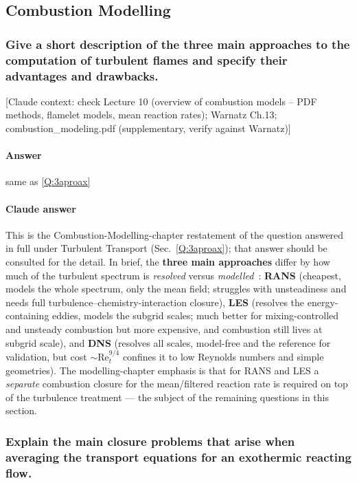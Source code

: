 \subsection{Combustion Modelling}

\subsubsection{Give a short description of the three main approaches to the computation of turbulent flames and specify their advantages and drawbacks.}

{\color{gray}\footnotesize [Claude context: check Lecture 10 (overview of combustion models -- PDF methods, flamelet models, mean reaction rates); Warnatz Ch.13; combustion\_modeling.pdf (supplementary, verify against Warnatz)]}

\paragraph{Answer}  same as \ref{Q:3aproax}

{\color{istblue}
\paragraph{Claude answer}
This is the Combustion-Modelling-chapter restatement of the question answered in full under Turbulent Transport (Sec.~\ref{Q:3aproax}); that answer should be consulted for the detail. In brief, the \textbf{three main approaches} differ by how much of the turbulent spectrum is \emph{resolved} versus \emph{modelled}~\cite{lecture10,veynante2002turbulent,pope2000turbulent}: \textbf{RANS} (cheapest, models the whole spectrum, only the mean field; struggles with unsteadiness and needs full turbulence--chemistry-interaction closure), \textbf{LES} (resolves the energy-containing eddies, models the subgrid scales; much better for mixing-controlled and unsteady combustion but more expensive, and combustion still lives at subgrid scale), and \textbf{DNS} (resolves all scales, model-free and the reference for validation, but cost $\sim\mathrm{Re}_t^{9/4}$ confines it to low Reynolds numbers and simple geometries). The modelling-chapter emphasis is that for RANS and LES a \emph{separate} combustion closure for the mean/filtered reaction rate is required on top of the turbulence treatment --- the subject of the remaining questions in this section.
}



\subsubsection{Explain the main closure problems that arise when averaging the transport equations for an exothermic reacting flow.}

